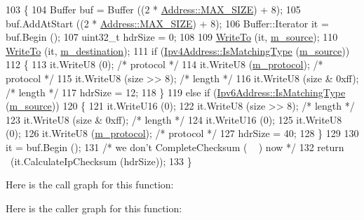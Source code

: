 \begin{DoxyCode}
103 \{
104   Buffer buf = Buffer ((2 * \hyperlink{classns3_1_1Address_a34cb50781c65195ba10651d82d084b4fae450cf1a7cb3df8a05d29b23aecf7f84}{Address::MAX\_SIZE}) + 8);
105   buf.AddAtStart ((2 * \hyperlink{classns3_1_1Address_a34cb50781c65195ba10651d82d084b4fae450cf1a7cb3df8a05d29b23aecf7f84}{Address::MAX\_SIZE}) + 8);
106   Buffer::Iterator it = buf.Begin ();
107   uint32\_t hdrSize = 0;
108 
109   \hyperlink{namespacens3_abe3cb0173e87a3f7e2e414358c0a08bf}{WriteTo} (it, \hyperlink{classns3_1_1UdpHeader_a66f5c7867ba9da25c94a4c947f4e9e6c}{m\_source});
110   \hyperlink{namespacens3_abe3cb0173e87a3f7e2e414358c0a08bf}{WriteTo} (it, \hyperlink{classns3_1_1UdpHeader_a262f3acd93ce4d1917917b2c1020e129}{m\_destination});
111   \textcolor{keywordflow}{if} (\hyperlink{classns3_1_1Ipv4Address_a7129db5e08739783b300976d28c0ced3}{Ipv4Address::IsMatchingType} (\hyperlink{classns3_1_1UdpHeader_a66f5c7867ba9da25c94a4c947f4e9e6c}{m\_source}))
112     \{
113       it.WriteU8 (0); \textcolor{comment}{/* protocol */}
114       it.WriteU8 (\hyperlink{classns3_1_1UdpHeader_a3c0ee9daf179e535e52bf6537b8bb095}{m\_protocol}); \textcolor{comment}{/* protocol */}
115       it.WriteU8 (size >> 8); \textcolor{comment}{/* length */}
116       it.WriteU8 (size & 0xff); \textcolor{comment}{/* length */}
117       hdrSize = 12;
118     \}
119   \textcolor{keywordflow}{else} \textcolor{keywordflow}{if} (\hyperlink{classns3_1_1Ipv6Address_adbe329370b5a8f7c0f48659d6439dfd1}{Ipv6Address::IsMatchingType} (\hyperlink{classns3_1_1UdpHeader_a66f5c7867ba9da25c94a4c947f4e9e6c}{m\_source}))
120     \{
121       it.WriteU16 (0);
122       it.WriteU8 (size >> 8); \textcolor{comment}{/* length */}
123       it.WriteU8 (size & 0xff); \textcolor{comment}{/* length */}
124       it.WriteU16 (0);
125       it.WriteU8 (0);
126       it.WriteU8 (\hyperlink{classns3_1_1UdpHeader_a3c0ee9daf179e535e52bf6537b8bb095}{m\_protocol}); \textcolor{comment}{/* protocol */}
127       hdrSize = 40;
128     \}
129 
130   it = buf.Begin ();
131   \textcolor{comment}{/* we don't CompleteChecksum ( ~ ) now */}
132   \textcolor{keywordflow}{return} ~(it.CalculateIpChecksum (hdrSize));
133 \}
\end{DoxyCode}


Here is the call graph for this function\+:




Here is the caller graph for this function\+:


